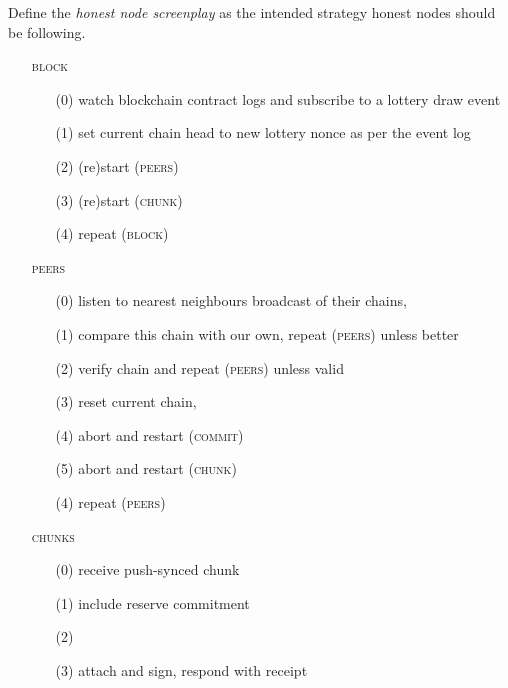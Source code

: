 \newpage
\begin{definition}
\label{def:honest-node-screenplay}
Define the \emph{honest node screenplay} as the intended  strategy honest nodes should be following.

\begin{itemize}[noitemsep]
\item[\textsc{\lowercase{block}}]
\item[]\begin{itemize}[noitemsep]
\item[(0)] watch blockchain contract logs and subscribe to a lottery draw event
\item[(1)]     
set current chain head to new lottery nonce as per the event log
\item[(2)] (re)start    (\textsc{peers}) 
\item[(3)] (re)start    (\textsc{chunk}) 
\item[(4)] repeat (\textsc{block})
\end{itemize}

\item[\textsc{\lowercase{peers}}]
\item[]\begin{itemize}[noitemsep]
\item[(0)]    
listen to nearest neighbours broadcast of their chains, 
\item[(1)]    
compare this chain with our own, repeat (\textsc{peers}) unless better
\item[(2)] 
verify chain and  repeat (\textsc{peers}) unless valid 
\item[(3)]    
reset current chain, 
\item[(4)]    
abort and restart (\textsc{commit})
\item[(5)]    
abort and restart (\textsc{chunk})
\item[(4)] repeat (\textsc{peers})
\end{itemize}

\item[\textsc{\lowercase{chunks}}]
\item[]\begin{itemize}[noitemsep]
\item[(0)]    
receive push-synced chunk  
\item[(1)] include reserve commitment
\item[(2)] 
\item[(3)] attach and sign, respond with receipt
\end{itemize}


\end{itemize}
\end{definition}
